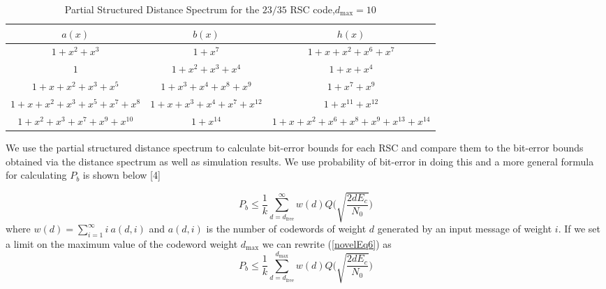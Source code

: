 \begin{table*}[h!]
 \caption{Partial Structured Distance Spectrum for the $23/35$ RSC code,$d_{\text{max}}=10$}
\centering
 \begin{tabular}{c c c} 
 \hline
 $a(x)$ & $b(x)$ & $h(x)$ \\ [0.5ex] 
 \hline\hline
$1+x^2+x^3$ & $1+x^7$ & $1+x+x^2+x^6+x^7$\\
\hline
$1$ & $1+x^2+x^3+x^4$ & $1+x+x^{4}$\\
\hline
$1+x+x^2+x^3+x^5$ & $1+x^3+x^4+x^8+x^9$ & $1+x^7+x^9$\\
\hline
$1+x+x^2+x^3+x^5+x^7+x^8$ & $1+x+x^3+x^4+x^7+x^{12}$ & $1+x^{11}+x^{12}$\\
\hline
$1+x^2+x^3+x^7+x^9+x^{10}$ & $1+x^{14}$ & $1+x+x^2+x^6+x^8+x^9+x^{13}+x^{14}$\\
 \end{tabular}
 
 \label{novelTab15}
\end{table*}
\newpage
We use the partial structured distance spectrum to calculate bit-error bounds for each RSC and compare them to the bit-error bounds obtained via the distance spectrum as well as simulation results. We use probability of bit-error in doing this and a more general formula for calculating $P_b$ is shown below [4]

\begin{equation}
P_b \leq \frac{1}{k} \sum_{d=d_{\text{free}}}^{\infty} w(d) Q\Bigg( \sqrt{\frac{2dE_c}{N_0}}\Bigg)
\label{novelEq6}
\end{equation}
where $w(d)=\sum_{i=1}^{\infty} i~ a(d,i)$ and $ a(d,i)$ is the number of codewords of weight $d$ generated by an input message of weight $i$. If we set a limit on the maximum value of the codeword weight $d_{\text{max}}$
 we can rewrite (\ref{novelEq6}) as 
\begin{equation}
P_b \leq \frac{1}{k} \sum_{d=d_{\text{free}}}^{d_{\text{max}}} w(d) Q\Bigg( \sqrt{\frac{2dE_c}{N_0}}\Bigg)
\label{novelEq7}
\end{equation}




